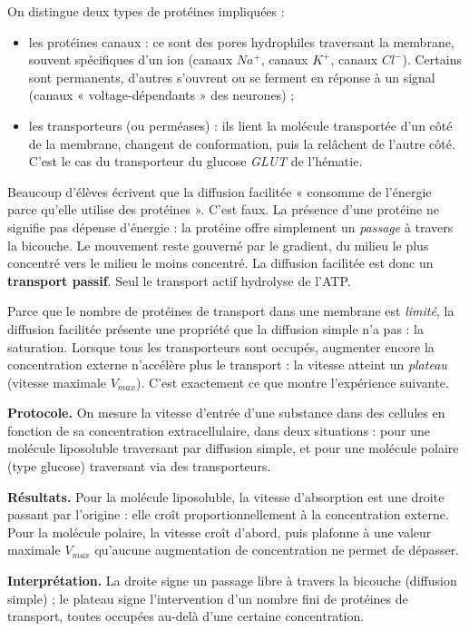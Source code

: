 \documentclass[11pt]{article}
\newcommand{\cle}[1]{{\popxbold\color{popdark}#1}}
\begin{document}
On distingue deux types de protéines impliquées :
\begin{itemize}
\item les \cle{protéines canaux} : ce sont des pores hydrophiles traversant la membrane, souvent spécifiques d'un ion (canaux $Na^+$, canaux $K^+$, canaux $Cl^-$). Certains sont permanents, d'autres s'ouvrent ou se ferment en réponse à un signal (canaux « voltage-dépendants » des neurones) ;
\item les \cle{transporteurs} (ou perméases) : ils lient la molécule transportée d'un côté de la membrane, changent de conformation, puis la relâchent de l'autre côté. C'est le cas du transporteur du glucose \emph{GLUT} de l'hématie.
\end{itemize}

\begin{attention}
Beaucoup d'élèves écrivent que la diffusion facilitée « consomme de l'énergie parce qu'elle utilise des protéines ». C'est faux. La présence d'une protéine ne signifie pas dépense d'énergie : la protéine offre simplement un \emph{passage} à travers la bicouche. Le mouvement reste gouverné par le gradient, du milieu le plus concentré vers le milieu le moins concentré. La diffusion facilitée est donc un \textbf{transport passif}. Seul le transport actif hydrolyse de l'ATP.
\end{attention}

Parce que le nombre de protéines de transport dans une membrane est \emph{limité}, la diffusion facilitée présente une propriété que la diffusion simple n'a pas : la \cle{saturation}. Lorsque tous les transporteurs sont occupés, augmenter encore la concentration externe n'accélère plus le transport : la vitesse atteint un \emph{plateau} (vitesse maximale $V_{max}$). C'est exactement ce que montre l'expérience suivante.

\begin{experience}
\textbf{Protocole.} On mesure la vitesse d'entrée d'une substance dans des cellules en fonction de sa concentration extracellulaire, dans deux situations : pour une molécule liposoluble traversant par diffusion simple, et pour une molécule polaire (type glucose) traversant via des transporteurs.

\textbf{Résultats.} Pour la molécule liposoluble, la vitesse d'absorption est une droite passant par l'origine : elle croît proportionnellement à la concentration externe. Pour la molécule polaire, la vitesse croît d'abord, puis plafonne à une valeur maximale $V_{max}$ qu'aucune augmentation de concentration ne permet de dépasser.

\textbf{Interprétation.} La droite signe un passage libre à travers la bicouche (diffusion simple) ; le plateau signe l'intervention d'un nombre fini de protéines de transport, toutes occupées au-delà d'une certaine concentration.
\end{experience}
\end{document}
